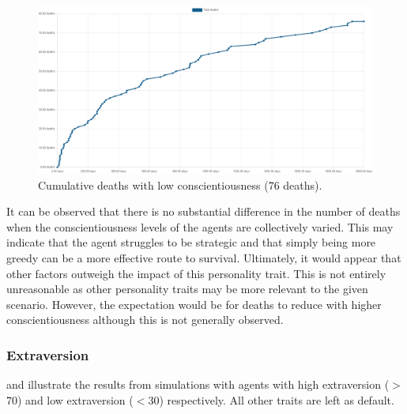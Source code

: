 \begin{figure}[H]
    \begin{center}
        \includegraphics[scale=0.25]{009_team_7_agent_design/Images/Cumulative Deaths, With Treaties, T7Only, 2000days, 20food, Low Conscient, 76deaths.png}
    \end{center}
    \caption{Cumulative deaths with low conscientiousness (76 deaths).}
    \label{fig: Low Conscientiousness}
\end{figure}

It can be observed that there is no substantial difference in the number of deaths when the conscientiousness levels of the agents are collectively varied. This may indicate that the agent struggles to be strategic and that simply being more greedy can be a more effective route to survival. Ultimately, it would appear that other factors outweigh the impact of this personality trait. This is not entirely unreasonable as other personality traits may be more relevant to the given scenario. However, the expectation would be for deaths to reduce with higher conscientiousness although this is not generally observed. 

\newpage
\subsubsection{Extraversion}
\label{subsubsec: Extraversion}
 and  illustrate the results from simulations with agents with high extraversion ($>$70) and low extraversion ($<$30) respectively. All other traits are left as default.

